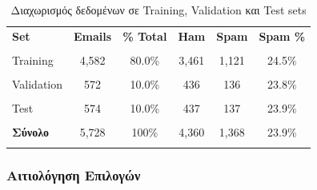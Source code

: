 \documentclass[12pt,a4paper,twoside]{book}
\begin{document}
\begin{table}[h]
    \centering
    \begin{tabular}{lccccc}
        \hline
        \textbf{Set}    & \textbf{Emails} & \textbf{\% Total} & \textbf{Ham} & \textbf{Spam} & \textbf{Spam \%} \\\\
        \hline
        Training        & 4,582           & 80.0\%            & 3,461        & 1,121         & 24.5\%           \\\\
        Validation      & 572             & 10.0\%            & 436          & 136           & 23.8\%           \\\\
        Test            & 574             & 10.0\%            & 437          & 137           & 23.9\%           \\\\
        \hline
        \textbf{Σύνολο} & 5,728           & 100\%             & 4,360        & 1,368         & 23.9\%           \\\\
        \hline
    \end{tabular}
    \caption{Διαχωρισμός δεδομένων σε Training, Validation και Test sets}
\end{table}

\subsubsection*{Αιτιολόγηση Επιλογών}
\end{document}
